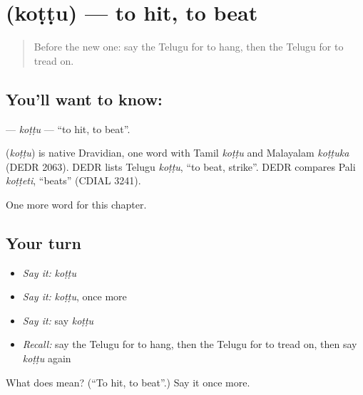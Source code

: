 \section[\texorpdfstring{\te{కొట్టు} (koṭṭu)}{కొట్టు (koṭṭu)}]{ (koṭṭu) — to hit, to beat}

\label{lesson:TE-C206-kottu}



\begin{quote}
Before the new one: say the Telugu for to hang, then the Telugu for to tread on.
\end{quote}

\subsection*{You'll want to know: }
\textbf{} — \emph{koṭṭu} — \textquotedblleft{}to hit, to beat\textquotedblright{}.

\begin{cousinweb}
\textbf{} (\emph{koṭṭu}) is native Dravidian, one word with Tamil \emph{koṭṭu} and Malayalam \emph{koṭṭuka} (DEDR 2063). DEDR lists Telugu \emph{koṭṭu}, \textquotedblleft{}to beat, strike\textquotedblright{}. DEDR compares Pali \emph{koṭṭeti}, \textquotedblleft{}beats\textquotedblright{} (CDIAL 3241).
\end{cousinweb}

\begin{grammarlens}[title={What you've built}]
One more word for this chapter.
\end{grammarlens}

\subsection*{Your turn}
\begin{itemize}
\raggedright
  \item \emph{Say it:} \emph{koṭṭu}
  \item \emph{Say it:} \emph{koṭṭu}, once more
  \item \emph{Say it:} say \emph{koṭṭu}
  \item \emph{Recall:} say the Telugu for to hang, then the Telugu for to tread on, then say \emph{koṭṭu} again
\end{itemize}

\begin{tcolorbox}[breakable,colback=teal!4,colframe=teal!35!black,title={Before you move on}]
What does  mean? (\textquotedblleft{}To hit, to beat\textquotedblright{}.) Say it once more.
\end{tcolorbox}
